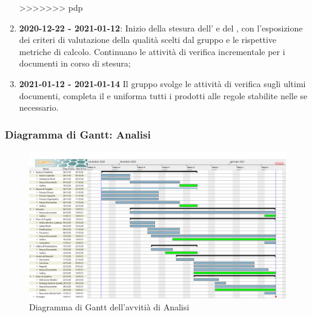 \begin{enumerate}
>>>>>>> pdp
\item \textbf{2020-12-22 - 2021-01-12}:
    Inizio della stesura dell'\textit{\AdR} e del \textit{\PdQ}, con l'esposizione dei criteri di valutazione della qualità scelti dal gruppo e le rispettive metriche di calcolo. Continuano le attività di verifica incrementale per i documenti in corso di stesura;
\item \textbf{2021-01-12 - 2021-01-14}
    Il gruppo svolge le attività di verifica sugli ultimi documenti, completa il \textit{\Glossario} e uniforma tutti i prodotti alle regole stabilite nelle \textit{\NdP} se necessario.
\end{enumerate}

\subsubsection{Diagramma di Gantt: Analisi}

\begin{figure}[ht]
    \centering
    \includegraphics[width=\textwidth]{../../Immagini/Analisi}
    \caption{Diagramma di Gantt dell'avvitià di Analisi}
\end{figure}
